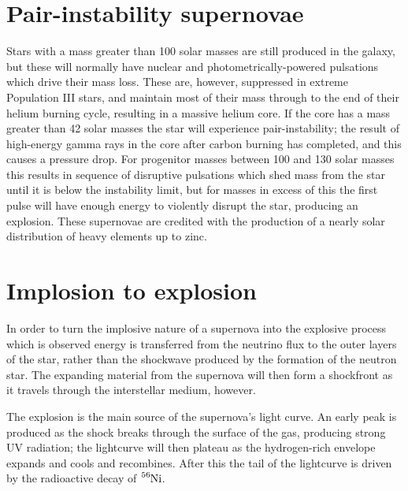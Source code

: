 \section{Pair-instability supernovae}
\label{sec:pair-inst-supern}

Stars with a mass greater than 100 solar masses are still produced in
the galaxy, but these will normally have nuclear and
photometrically-powered pulsations which drive their mass loss. These
are, however, suppressed in extreme Population III stars, and maintain
most of their mass through to the end of their helium burning cycle,
resulting in a massive helium core. If the core has a mass greater
than 42 solar masses the star will experience pair-instability; the
result of high-energy gamma rays in the core after carbon burning has
completed, and this causes a pressure drop. For progenitor masses
between 100 and 130 solar masses this results in sequence of
disruptive pulsations which shed mass from the star until it is below
the instability limit, but for masses in excess of this the first
pulse will have enough energy to violently disrupt the star, producing
an explosion. These supernovae are credited with the production of a
nearly solar distribution of heavy elements up to zinc.

\section{Implosion to explosion}
\label{sec:implosion-explosion}

In order to turn the implosive nature of a supernova into the
explosive process which is observed energy is transferred from the
neutrino flux to the outer layers of the star, rather than the
shockwave produced by the formation of the neutron star. The expanding
material from the supernova will then form a shockfront as it travels
through the interstellar medium, however.

The explosion is the main source of the supernova's light curve. An
early peak is produced as the shock breaks through the surface of the
gas, producing strong UV radiation; the lightcurve will then plateau
as the hydrogen-rich envelope expands and cools and recombines. After
this the tail of the lightcurve is driven by the radioactive decay of
$\ce{^{56}Ni}$.

